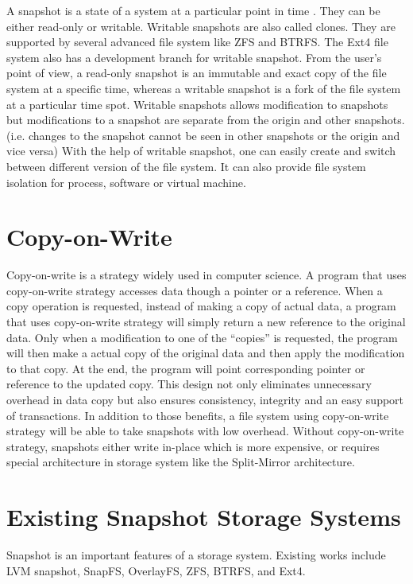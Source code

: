     A snapshot is a state of a system at a particular point in time \cite{btrfscow}. They can be either read-only or writable. Writable snapshots are also called clones. They are supported by several advanced file system like ZFS and BTRFS. The Ext4 file system also has a development branch for writable snapshot. From the user’s point of view, a read-only snapshot is an immutable and exact copy of the file system at a specific time, whereas a writable snapshot is a fork of the file system at a particular time spot. Writable snapshots allows modification to snapshots but modifications to a snapshot are separate from the origin and other snapshots. (i.e. changes to the snapshot cannot be seen in other snapshots or the origin and vice versa) With the help of writable snapshot, one can easily create and switch between different version of the file system. It can also provide file system isolation for process, software or virtual machine.

\section{Copy-on-Write}

    Copy-on-write is a strategy widely used in computer science. A program that uses copy-on-write strategy accesses data though a pointer or a reference. When a copy operation is requested, instead of making a copy of actual data, a program that uses copy-on-write strategy will simply return a new reference to the original data. Only when a modification to one of the ``copies'' is requested, the program will then make a actual copy of the original data and then apply the modification to that copy. At the end, the program will point corresponding pointer or reference to the updated copy. This design not only eliminates unnecessary overhead in data copy but also ensures consistency, integrity and an easy support of transactions. In addition to those benefits, a file system using copy-on-write strategy will be able to take snapshots with low overhead. Without copy-on-write strategy, snapshots either write in-place which is more expensive, or requires special architecture in storage system like the Split-Mirror architecture.

\section{Existing Snapshot Storage Systems}

    Snapshot is an important features of a storage system. Existing works include LVM snapshot, SnapFS, OverlayFS, ZFS, BTRFS, and Ext4.
    
